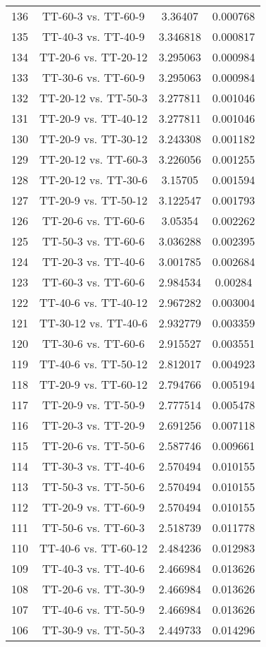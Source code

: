\documentclass[a4paper,10pt]{article}
\begin{document}
\begin{landscape}
\begin{table}[!htp]
\begin{tabular}{cccc}
136&TT-60-3 vs. TT-60-9&3.36407&0.000768\\
135&TT-40-3 vs. TT-40-9&3.346818&0.000817\\
134&TT-20-6 vs. TT-20-12&3.295063&0.000984\\
133&TT-30-6 vs. TT-60-9&3.295063&0.000984\\
132&TT-20-12 vs. TT-50-3&3.277811&0.001046\\
131&TT-20-9 vs. TT-40-12&3.277811&0.001046\\
130&TT-20-9 vs. TT-30-12&3.243308&0.001182\\
129&TT-20-12 vs. TT-60-3&3.226056&0.001255\\
128&TT-20-12 vs. TT-30-6&3.15705&0.001594\\
127&TT-20-9 vs. TT-50-12&3.122547&0.001793\\
126&TT-20-6 vs. TT-60-6&3.05354&0.002262\\
125&TT-50-3 vs. TT-60-6&3.036288&0.002395\\
124&TT-20-3 vs. TT-40-6&3.001785&0.002684\\
123&TT-60-3 vs. TT-60-6&2.984534&0.00284\\
122&TT-40-6 vs. TT-40-12&2.967282&0.003004\\
121&TT-30-12 vs. TT-40-6&2.932779&0.003359\\
120&TT-30-6 vs. TT-60-6&2.915527&0.003551\\
119&TT-40-6 vs. TT-50-12&2.812017&0.004923\\
118&TT-20-9 vs. TT-60-12&2.794766&0.005194\\
117&TT-20-9 vs. TT-50-9&2.777514&0.005478\\
116&TT-20-3 vs. TT-20-9&2.691256&0.007118\\
115&TT-20-6 vs. TT-50-6&2.587746&0.009661\\
114&TT-30-3 vs. TT-40-6&2.570494&0.010155\\
113&TT-50-3 vs. TT-50-6&2.570494&0.010155\\
112&TT-20-9 vs. TT-60-9&2.570494&0.010155\\
111&TT-50-6 vs. TT-60-3&2.518739&0.011778\\
110&TT-40-6 vs. TT-60-12&2.484236&0.012983\\
109&TT-40-3 vs. TT-40-6&2.466984&0.013626\\
108&TT-20-6 vs. TT-30-9&2.466984&0.013626\\
107&TT-40-6 vs. TT-50-9&2.466984&0.013626\\
106&TT-30-9 vs. TT-50-3&2.449733&0.014296\\

\end{tabular}
\end{table}
\end{landscape}
\end{document}
